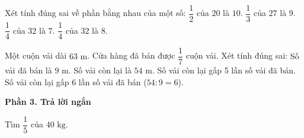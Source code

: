 \begin{ex} %
Xét tính đúng sai về phần bằng nhau của một số:
\choiceTF
{\True $\dfrac{1}{2}$ của $20$ là $10$.}
{\True $\dfrac{1}{3}$ của $27$ là $9$.}
{$\dfrac{1}{4}$ của $32$ là $7$.}
{\True $\dfrac{1}{4}$ của $32$ là $8$.}
\end{ex}

\begin{ex} %
Một cuộn vải dài $63\text{ m}$. Cửa hàng đã bán được $\dfrac{1}{7}$ cuộn vải. Xét tính đúng sai:
\choiceTF
{\True Số vải đã bán là $9\text{ m}$.}
{\True Số vải còn lại là $54\text{ m}$.}
{Số vải còn lại gấp 5 lần số vải đã bán.}
{\True Số vải còn lại gấp 6 lần số vải đã bán ($54 : 9 = 6$).}
\end{ex}

\textbf{Phần 3. Trả lời ngắn}

\begin{ex} %
Tìm $\dfrac{1}{5}$ của $40\text{ kg}$.
\end{ex}

